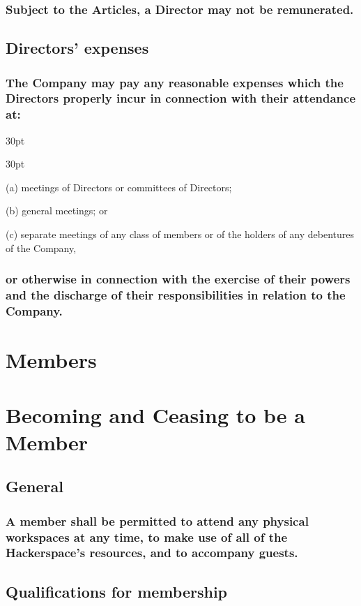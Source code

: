 \documentclass[12pt]{article}
\def\clauseindent{30pt}
\newenvironment{subindentlist}{\begin{adjustwidth}{\clauseindent}{}\begin{labeledlist}{\clauseindent}}{\end{labeledlist}\end{adjustwidth}}
\begin{document}
\subsubsection{Subject to the Articles, a Director may not be remunerated.}

\subsection{Directors’ expenses}
\subsubsection{The Company may pay any reasonable expenses which the Directors properly incur in connection with their attendance at:}
\begin{subindentlist}
    \item [(a)] meetings of Directors or committees of Directors;
    \item [(b)] general meetings; or
    \item [(c)] separate meetings of any class of members or of the holders of any debentures of the Company,
\end{subindentlist}
\subsubsection{or otherwise in connection with the exercise of their powers and the discharge of their responsibilities in relation to the Company.}

\section*{Members}
\section*{Becoming and Ceasing to be a Member}

\subsection{General}
\subsubsection{A member shall be permitted to attend any physical workspaces at any time, to make use of all of the Hackerspace's resources, and to accompany guests.}

\subsection{Qualifications for membership}
\end{document}
